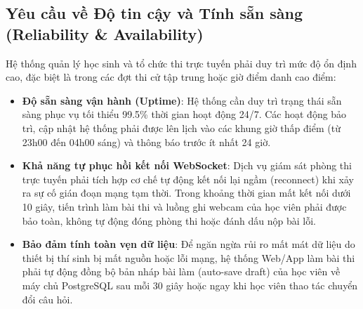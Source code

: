\documentclass[../DoAn.tex]{subfiles}
\begin{document}
\subsection{Yêu cầu về Độ tin cậy và Tính sẵn sàng (Reliability \& Availability)}
Hệ thống quản lý học sinh và tổ chức thi trực tuyến phải duy trì mức độ ổn định cao, đặc biệt là trong các đợt thi cử tập trung hoặc giờ điểm danh cao điểm:
\begin{itemize}
    \item \textbf{Độ sẵn sàng vận hành (Uptime)}: Hệ thống cần duy trì trạng thái sẵn sàng phục vụ tối thiểu 99.5\% thời gian hoạt động 24/7. Các hoạt động bảo trì, cập nhật hệ thống phải được lên lịch vào các khung giờ thấp điểm (từ 23h00 đến 04h00 sáng) và thông báo trước ít nhất 24 giờ.
    \item \textbf{Khả năng tự phục hồi kết nối WebSocket}: Dịch vụ giám sát phòng thi trực tuyến phải tích hợp cơ chế tự động kết nối lại ngầm (reconnect) khi xảy ra sự cố gián đoạn mạng tạm thời. Trong khoảng thời gian mất kết nối dưới 10 giây, tiến trình làm bài thi và luồng ghi webcam của học viên phải được bảo toàn, không tự động đóng phòng thi hoặc đánh dấu nộp bài lỗi.
    \item \textbf{Bảo đảm tính toàn vẹn dữ liệu}: Để ngăn ngừa rủi ro mất mát dữ liệu do thiết bị thí sinh bị mất nguồn hoặc lỗi mạng, hệ thống Web/App làm bài thi phải tự động đồng bộ bản nháp bài làm (auto-save draft) của học viên về máy chủ PostgreSQL sau mỗi 30 giây hoặc ngay khi học viên thao tác chuyển đổi câu hỏi.
\end{itemize}
\end{document}
